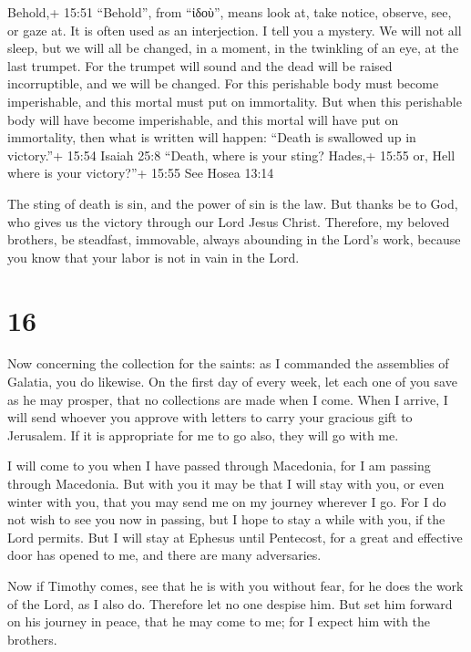  Behold,+ 15:51 ``Behold'', from ``ἰδοὺ'', means look at,
take notice, observe, see, or gaze at. It is often used as an
interjection. I tell you a mystery. We will not all sleep, but we will
all be changed,  in a moment, in the twinkling of an eye,
at the last trumpet. For the trumpet will sound and the dead will be
raised incorruptible, and we will be changed.  For this
perishable body must become imperishable, and this mortal must put on
immortality.  But when this perishable body will have
become imperishable, and this mortal will have put on immortality, then
what is written will happen: ``Death is swallowed up in victory.''+
15:54 Isaiah 25:8  ``Death, where is your sting? Hades,+
15:55 or, Hell where is your victory?''+ 15:55 See Hosea 13:14

 The sting of death is sin, and the power of sin is the
law.  But thanks be to God, who gives us the victory
through our Lord Jesus Christ.  Therefore, my beloved
brothers, be steadfast, immovable, always abounding in the Lord's work,
because you know that your labor is not in vain in the Lord.

\hypertarget{section-15}{%
\section{16}\label{section-15}}

 Now concerning the collection for the saints: as I
commanded the assemblies of Galatia, you do likewise.  On
the first day of every week, let each one of you save as he may prosper,
that no collections are made when I come.  When I arrive, I
will send whoever you approve with letters to carry your gracious gift
to Jerusalem.  If it is appropriate for me to go also, they
will go with me.

 I will come to you when I have passed through Macedonia,
for I am passing through Macedonia.  But with you it may be
that I will stay with you, or even winter with you, that you may send me
on my journey wherever I go.  For I do not wish to see you
now in passing, but I hope to stay a while with you, if the Lord
permits.  But I will stay at Ephesus until Pentecost,
 for a great and effective door has opened to me, and there
are many adversaries.

 Now if Timothy comes, see that he is with you without
fear, for he does the work of the Lord, as I also do. 
Therefore let no one despise him. But set him forward on his journey in
peace, that he may come to me; for I expect him with the brothers.

